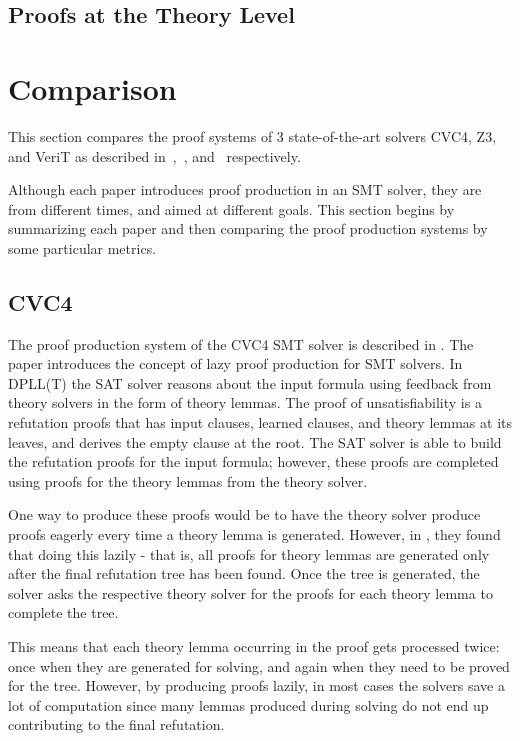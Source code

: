 \documentclass{article}
\begin{document}
\subsection{Proofs at the Theory Level}
\label{sec:theoryproofs}

\section{Comparison}
\label{sec:comp}
This section compares the proof systems of 3 state-of-the-art 
solvers CVC4, Z3, and VeriT as described in~\cite{DBLP:conf/fmcad/KatzBTRH16},~\cite{DBLP:conf/lpar/MouraB08}, 
and~\cite{DBLP:conf/tacas/FontaineMMNT06} respectively.

Although each paper introduces proof production in an SMT 
solver, they are from different times, and aimed at different 
goals. This section begins by summarizing each paper and then 
comparing the proof production systems by some particular 
metrics.

\subsection{CVC4}
\label{sec:cvc4}
The proof production system of the CVC4 SMT solver is described 
in \cite{DBLP:conf/fmcad/KatzBTRH16}. The paper introduces the 
concept of lazy proof production for SMT solvers. In DPLL(T) 
the SAT solver reasons about the input formula using feedback 
from theory solvers in the form of theory lemmas. The proof 
of unsatisfiability is a refutation proofs that has input clauses,
learned clauses, and theory lemmas at its leaves, 
and derives the empty clause at the root. The SAT solver is able 
to build the refutation proofs for the input formula; however,
these proofs are completed using proofs for the theory
lemmas from the theory solver. 

One way to produce these proofs would be to have the theory solver 
produce proofs eagerly every time a theory lemma is generated. 
However, in \cite{DBLP:conf/fmcad/KatzBTRH16}, they found that
doing this lazily - that is, all proofs for theory lemmas are 
generated only after the final refutation tree has been found. 
Once the tree is generated, the solver asks the respective theory
solver for the proofs for each theory lemma to complete the tree.

This means that each theory lemma occurring in the proof gets 
processed twice: once when they are generated for solving, and 
again when they need to be proved for the tree. However, by 
producing proofs lazily, in most cases the solvers save a lot 
of computation since many lemmas produced during solving do not
end up contributing to the final refutation.
\end{document}
